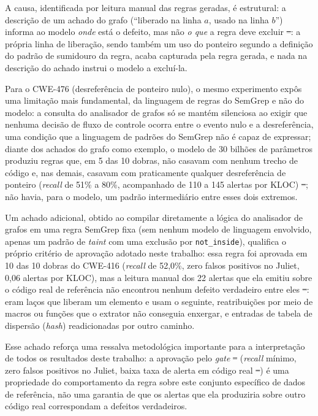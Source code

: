 \documentclass[
    12pt,                %
    openright,           %
    oneside,             %
    a4paper,             %
    english,             %
    brazil               %
]{abntex2}
\newcommand{\antigo}[1]{\sout{#1}}
\newcommand{\novo}[1]{{\color{red}#1}}
\begin{document}
\par
A causa, identificada por leitura manual das regras geradas, é estrutural: a descrição de um achado do grafo (``liberado na linha $a$, usado na linha $b$'') informa ao modelo \textit{onde} está o defeito, mas não \textit{o que} a regra deve excluir\antigo{ --}\novo{:} a própria linha de liberação, sendo também um uso do ponteiro segundo a definição do padrão de sumidouro da regra, acaba capturada pela regra gerada, e nada na descrição do achado instrui o modelo a excluí-la.
\par
Para o CWE-476 (desreferência de ponteiro nulo), o mesmo experimento expôs uma limitação mais fundamental, da linguagem de regras do SemGrep e não do modelo: a consulta do analisador de grafos só se mantém silenciosa ao exigir que nenhuma decisão de fluxo de controle ocorra entre o evento nulo e a desreferência, uma condição que a linguagem de padrões do SemGrep não é capaz de expressar; diante dos achados do grafo como exemplo, o modelo de 30 bilhões de parâmetros produziu regras que, em 5 das 10 dobras, não casavam com nenhum trecho de código e, nas demais, casavam com praticamente qualquer desreferência de ponteiro (\textit{recall} de 51\% a 80\%, acompanhado de 110 a 145 alertas por KLOC)\antigo{ --}\novo{;} não havia, para o modelo, um padrão intermediário entre esses dois extremos.
\par
Um achado adicional, obtido ao compilar diretamente a lógica do analisador de grafos em uma regra SemGrep fixa (sem nenhum modelo de linguagem envolvido, apenas um padrão de \textit{taint} com uma exclusão por \texttt{not\_inside}), qualifica o próprio critério de aprovação adotado neste trabalho: essa regra foi aprovada em 10 das 10 dobras do CWE-416 (\textit{recall} de 52,0\%, zero falsos positivos no Juliet, 0,06 alertas por KLOC), mas a leitura manual dos 22 alertas que ela emitiu sobre o código real de referência não encontrou nenhum defeito verdadeiro entre eles\antigo{ --}\novo{:} eram laços que liberam um elemento e usam o seguinte, reatribuições por meio de macros ou funções que o extrator não conseguia enxergar, e entradas de tabela de dispersão (\textit{hash}) readicionadas por outro caminho.
\par
Esse achado reforça uma ressalva metodológica importante para a interpretação de todos os resultados deste trabalho: a aprovação pelo \textit{gate}\antigo{ --}\novo{ (}\textit{recall} mínimo, zero falsos positivos no Juliet, baixa taxa de alerta em código real\antigo{ --}\novo{)} é uma propriedade do comportamento da regra sobre este conjunto específico de dados de referência, não uma garantia de que os alertas que ela produziria sobre outro código real correspondam a defeitos verdadeiros.
\end{document}
